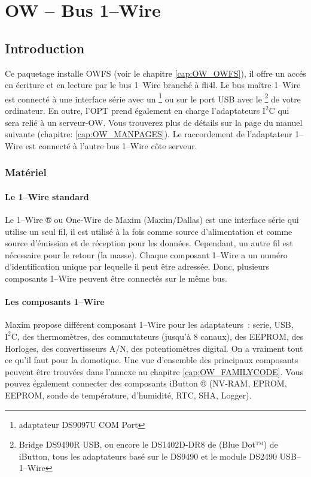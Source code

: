 {
\section {OW -- Bus 1--Wire }
}
\setcounter{secnumdepth}{6}

\newcommand{\IsqC}{$\textrm{I}^{\textrm{2}}\textrm{C}$}
\newcommand{\isqc}{$\textrm{i}^{\textrm{2}}\textrm{c}$}

\subsection{Introduction}

Ce paquetage installe OWFS (voir le chapitre \ref{cap:OW_OWFS}), il offre un accés en écriture
et en lecture par le bus 1--Wire branché à fli4l. Le bus maître 1--Wire est connecté à une
interface série avec un \footnote{adaptateur DS9097U COM Port} ou sur le port USB avec le
\footnote{Bridge DS9490R USB, ou encore le DS1402D-DR8 de (Blue Dot™) de iButton, tous
les adaptateurs basé sur le DS9490 et le module DS2490 USB--1--Wire} de votre ordinateur.
En outre, l'OPT prend également en charge l'adaptateurs \IsqC{} qui sera relié à un serveur-OW.
Vous trouverez plus de détails sur la page du manuel suivante (chapitre: \ref{cap:OW_MANPAGES}).
Le raccordement de l'adaptateur 1--Wire est connecté à l'autre bus 1--Wire côte serveur.

\subsubsection{Matériel}
\paragraph{Le 1--Wire standard}
Le 1--Wire ® ou One-Wire de Maxim (Maxim/Dallas) est une interface série qui utilise un seul fil,
il est utilisé à la fois comme source d'alimentation et comme source d'émission et de réception
pour les données. Cependant, un autre fil est nécessaire pour le \flqq{}retour\frqq{} (la masse).
Chaque composant 1--Wire a un numéro d'identification unique par lequelle il peut être adressée.
Donc, plusieurs composants 1--Wire peuvent être connectés sur le même bus.

\paragraph{Les composants 1--Wire}
Maxim propose différent composant 1--Wire pour les adaptateurs~: serie, USB, \IsqC, des thermomètres,
des commutateurs (jusqu'à 8 canaux), des EEPROM, des Horloges, des convertisseurs A/N, des
potentiomètres digital. On a vraiment tout ce qu'il faut pour la domotique. Une vue d'ensemble
des principaux composants peuvent être trouvées dans l'annexe au chapitre \ref{cap:OW_FAMILYCODE}.
Vous pouvez également connecter des composants iButton ® (NV-RAM, EPROM, EEPROM, sonde de température,
d'humidité, RTC, SHA, Logger).

